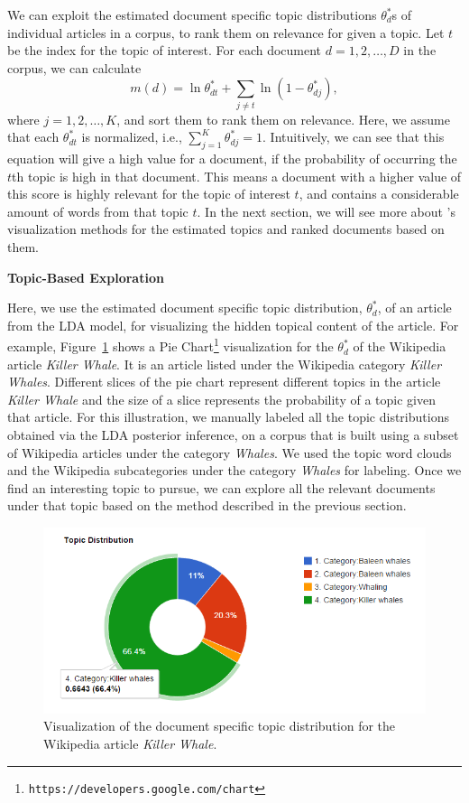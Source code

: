 We can exploit the estimated document specific topic distributions 
$\theta_d^{*}$s of individual articles in a corpus, to rank them on 
relevance for given a topic. Let $t$ be the index for the topic of 
interest. For each document $d = 1, 2, \ldots, D$ in the corpus, we 
can calculate~\cite{George2012}
\begin{equation}
m(d) = \ln \theta^*_{dt} + \sum_{j \neq t}{\ln (1 - \theta^*_{dj})},
\end{equation} 
where $j = 1, 2, \ldots, K$, and sort them to rank them on relevance. 
Here, we assume that each $\theta^*_{dt}$ is normalized, i.e., 
$\sum_{j=1}^{K}{\theta^*_{dj}} = 1$. Intuitively, we can see that 
this equation will give a high value for a document, if the 
probability of occurring the $t$th topic is high in that document. 
This means a document with a higher value of this score is highly 
relevant for the topic of interest $t$, and contains a considerable 
amount of words from that topic $t$. In the next section, we will 
see more about \system's visualization methods for the estimated 
topics and ranked documents based on them.      


\noindent\textbf{Topic-Based Exploration}

Here, we use the estimated document specific topic distribution, 
$\theta^*_{d}$, of an article from the LDA model, for visualizing 
the hidden topical content of the article. For example, Figure~\ref{fig:doc-topic-distribution} shows a Pie 
Chart\footnote{\texttt{https://developers.google.com/chart}} 
visualization for 
the $\theta^*_{d}$ of the Wikipedia article \textit{Killer Whale}.
It is an article listed under the Wikipedia category          
\textit{Killer Whales}. Different slices of the pie chart represent
different topics in the article \textit{Killer Whale} and the size 
of a slice represents the probability of a topic given that article. 
For this illustration, we manually labeled all the topic 
distributions obtained via the LDA posterior inference, on a 
corpus that is built using a subset of Wikipedia articles under the 
category \textit{Whales}. We used the topic word clouds 
and the Wikipedia subcategories under the category \textit{Whales} 
for labeling. Once we find an interesting topic to pursue, we can 
explore all the relevant documents under that topic based on the 
method described in the previous section. 

\begin{figure}[htb]\centering 
\includegraphics[width=.45\textwidth]{images/doc_topic_distribution.png}
\caption{Visualization of the document specific topic distribution 
for the Wikipedia article \textit{Killer Whale}.}
\label{fig:doc-topic-distribution}
\end{figure}

